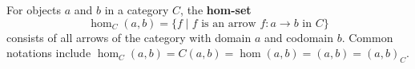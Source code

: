 For objects $a$ and $b$ in a category $C$, the \textbf{hom-set}
\[
\hom_C(a, b) = \{ f \mid f \text{ is an arrow } f: a \rightarrow b \text{ in } C \}
\]
consists of all arrows of the category with domain $a$ and codomain $b$. Common notations include $\hom_C(a,b) = C(a,b) = \hom(a,b) = (a,b) = (a,b)_C$.